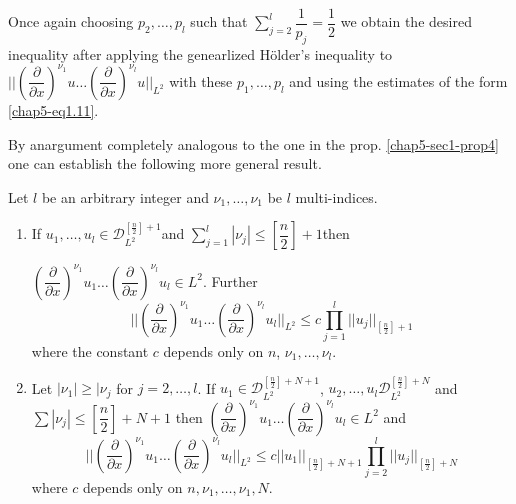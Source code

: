 Once again choosing $p_2, \ldots,p_l$ such that $\sum\limits^l_{j=2}
\dfrac{1}{p_j}= \dfrac{1}{2}$ we obtain the desired inequality after
applying the genearlized H\"older's inequality to $||
\left(\dfrac{\partial}{\partial x}\right)^{\nu_1} u \ldots
\left(\dfrac{\partial}{\partial x}\right)^{\nu_l} u ||_{L^2}$ with these $p_1,
\ldots, p_l$ and using the estimates of the form \eqref{chap5-eq1.11}. 

By an\pageoriginale argument completely analogous to the one in the
prop. \ref{chap5-sec1-prop4} one can establish the following more
general result.   

\begin{proposition}\label{chap5-sec1-prop5}%
Let $l$ be an arbitrary integer and $\nu_1, \ldots, \nu_1$ be $l$
multi-indices. 
\begin{enumerate}[\rm(i)]
 \item If $u_1, \ldots, u_l \in
   \mathscr{D}^{\left[\frac{n}{2} \right]+1}_{L^2}$\quad and\quad
   $\sum\limits^l_{j=1} | 
   \nu_j | \leq \left[\dfrac{n}{2} \right] + 1$\quad then

   $\left(\dfrac{\partial}{\partial x}\right)^{\nu_1} u_1 \ldots
   \left(\dfrac{\partial}{\partial x}\right)^{\nu_l} u_l 
   \in L^2$. Further 
\begin{equation*}
|| \left(\frac{\partial}{\partial x}\right)^{\nu_1} u_1 \ldots
\left(\frac{\partial}{\partial x}\right)^{\nu_l} u_l ||_{L^2} \leq c
\prod\limits^l_{j=1} || u_j ||_{\left[\frac{n}{2} \right]+1}
\tag{1.17}\label{chap5-eq1.17}  
\end{equation*} 
where the constant $c$ depends only on $n$, $\nu_1, \ldots, \nu_l$.  

\item Let $| \nu_1 | \geq | \nu_j $ for $j = 2, \ldots, l$. If $u_1
  \in \mathscr{D}^{\left[\frac{n}{2} \right]+N+1}_{L^2}$, $u_2,
  \ldots, u_l 
  \mathscr{D}^{\left[\frac{n}{2}\right]+N}_{L^2}$ and $ \sum | \nu_j | \leq
          \left[\dfrac{n}{2}\right] + N + 1$ then
          $\left(\dfrac{\partial}{\partial x}\right)^{\nu_1} u_1
          \ldots \left(\dfrac{\partial}{\partial 
            x}\right)^{\nu_l} u_l \in L^2$ and 
 \begin{equation*}
|| \left(\frac{\partial}{\partial x}\right)^{\nu_1} u_1 \ldots
\left(\frac{\partial}{\partial x}\right)^{\nu_l} u_l ||_{L^2} \leq c || u_1
||_{\left[\frac{n}{2} \right] + N + 1} \prod\limits^l_{j=2} || u_j
||_{\left[\frac{n}{2} \right]+N} 
\tag{1.18} \label{chap5-eq1.18}
 \end{equation*} 
where $c$ depends only on $n, \nu_1, \ldots, \nu_1, N$.
\end{enumerate}
\end{proposition}

